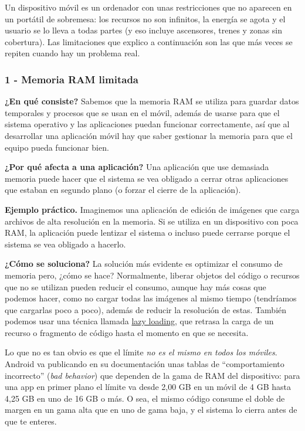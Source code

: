 \documentclass[11pt,a4paper]{article}
\newcommand{\campo}[1]{\textbf{\color{primary}#1}}
\begin{document}
	Un dispositivo móvil es un ordenador con unas restricciones que no aparecen en un portátil de sobremesa: los recursos no son infinitos, la energía se agota y el usuario se lo lleva a todas partes (y eso incluye ascensores, trenes y zonas sin cobertura). Las limitaciones que explico a continuación son las que más veces se repiten cuando hay un problema real.
	
	\subsubsection*{1 - Memoria RAM limitada}
	
	\campo{¿En qué consiste?}
	Sabemos que la memoria RAM se utiliza para guardar datos temporales y procesos que se usan en el móvil, además de usarse para que el sistema operativo y las aplicaciones puedan funcionar correctamente, así que al desarrollar una aplicación móvil hay que saber gestionar la memoria para que el equipo pueda funcionar bien.
	
	\campo{¿Por qué afecta a una aplicación?}
	Una aplicación que use demasiada memoria puede hacer que el sistema se vea obligado a cerrar otras aplicaciones que estaban en segundo plano (o forzar el cierre de la aplicación).
	
	\campo{Ejemplo práctico.}
	Imaginemos una aplicación de edición de imágenes que carga archivos de alta resolución en la memoria. Si se utiliza en un dispositivo con poca RAM, la aplicación puede lentizar el sistema o incluso puede cerrarse porque el sistema se vea obligado a hacerlo.
	
	\campo{¿Cómo se soluciona?}
	La solución más evidente es optimizar el consumo de memoria pero, ¿cómo se hace? Normalmente, liberar objetos del código o recursos que no se utilizan pueden reducir el consumo, aunque hay más cosas que podemos hacer, como no cargar todas las imágenes al mismo tiempo (tendríamos que cargarlas poco a poco), además de reducir la resolución de estas. También podemos usar una técnica llamada \href{https://es.wikipedia.org/wiki/Lazy_loading}{lazy loading}, que retrasa la carga de un recurso o fragmento de código hasta el momento en que se necesita.
	
	Lo que no es tan obvio es que el límite \emph{no es el mismo en todos los móviles}. Android va publicando en su documentación unas tablas de \enquote{comportamiento incorrecto} (\emph{bad behavior}) que dependen de la gama de RAM del dispositivo: para una app en primer plano el límite va desde 2,00 GB en un móvil de 4 GB hasta 4,25 GB en uno de 16 GB o más. O sea, el mismo código consume el doble de margen en un gama alta que en uno de gama baja, y el sistema lo cierra antes de que te enteres.
	
\end{document}
